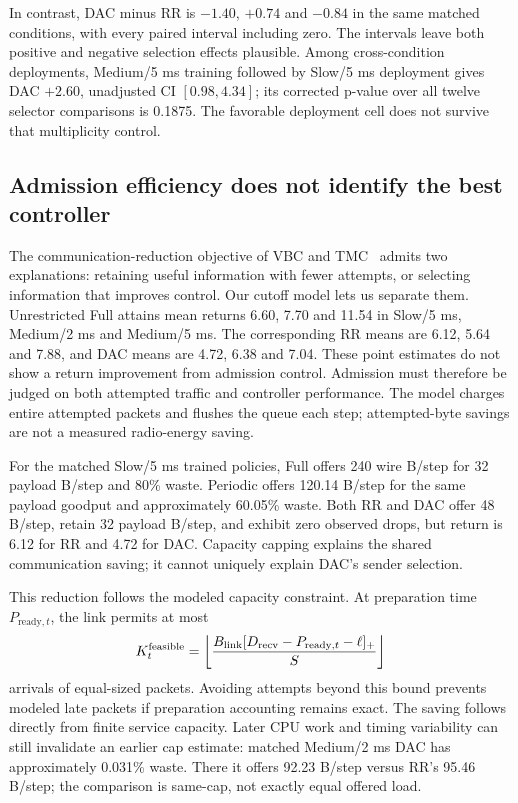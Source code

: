 \documentclass[10pt]{article}
\begin{document}
In contrast, DAC minus RR is $-1.40$, $+0.74$ and $-0.84$ in the same matched conditions, with every paired interval including zero. The intervals leave both positive and negative selection effects plausible. Among cross-condition deployments, Medium/5 ms training followed by Slow/5 ms deployment gives DAC $+2.60$, unadjusted CI $[0.98,4.34]$; its corrected p-value over all twelve selector comparisons is 0.1875. The favorable deployment cell does not survive that multiplicity control.

\subsection{Admission efficiency does not identify the best controller}
The communication-reduction objective of VBC and TMC~\citep{zhang2019efficient,zhang2020succinct} admits two explanations: retaining useful information with fewer attempts, or selecting information that improves control. Our cutoff model lets us separate them. Unrestricted Full attains mean returns 6.60, 7.70 and 11.54 in Slow/5 ms, Medium/2 ms and Medium/5 ms. The corresponding RR means are 6.12, 5.64 and 7.88, and DAC means are 4.72, 6.38 and 7.04. These point estimates do not show a return improvement from admission control. Admission must therefore be judged on both attempted traffic and controller performance. The model charges entire attempted packets and flushes the queue each step; attempted-byte savings are not a measured radio-energy saving.


For the matched Slow/5 ms trained policies, Full offers 240 wire B/step for 32 payload B/step and 80\% waste. Periodic offers 120.14 B/step for the same payload goodput and approximately 60.05\% waste. Both RR and DAC offer 48 B/step, retain 32 payload B/step, and exhibit zero observed drops, but return is 6.12 for RR and 4.72 for DAC. Capacity capping explains the shared communication saving; it cannot uniquely explain DAC's sender selection.

This reduction follows the modeled capacity constraint. At preparation time $P_{\mathrm{ready},t}$, the link permits at most
\begin{equation}
 K_t^{\mathrm{feasible}}=\left\lfloor \frac{B_{\rm link}[D_{\rm recv}-P_{\mathrm{ready},t}-\ell]_+}{S}\right\rfloor
\end{equation}
arrivals of equal-sized packets. Avoiding attempts beyond this bound prevents modeled late packets if preparation accounting remains exact. The saving follows directly from finite service capacity. Later CPU work and timing variability can still invalidate an earlier cap estimate: matched Medium/2 ms DAC has approximately 0.031\% waste. There it offers 92.23 B/step versus RR's 95.46 B/step; the comparison is same-cap, not exactly equal offered load.
\end{document}
